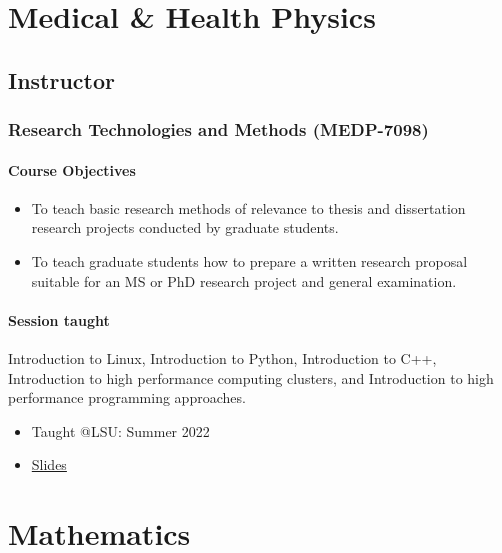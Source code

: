 \documentclass[11pt,a4paper]{article}
\begin{document}
\section*{Medical \& Health Physics}

\subsection*{Instructor}

\subsubsection*{Research Technologies and Methods (MEDP-7098)}

\paragraph{Course Objectives}

\begin{itemize}
\item To teach basic research methods of relevance to thesis and dissertation research projects conducted by graduate students.
\item To teach graduate students how to prepare a written research proposal suitable for an MS or PhD research project and general examination.
\end{itemize}

\paragraph{Session taught}

Introduction to Linux, Introduction to Python, Introduction to C++, Introduction to high performance computing clusters,  and Introduction to high performance programming approaches.

\begin{itemize}
\item Taught @LSU: Summer 2022
\item \href{https://github.com/diehlpkteaching/MEDP-7098}{Slides}
\end{itemize}



\section*{Mathematics}
\end{document}
